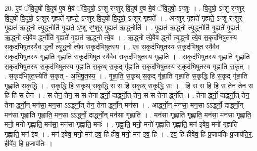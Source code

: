 \documentclass[17pt]{extarticle}
\begin{document}
20. ए॒वं ॅवि॒दुषो॑ वि॒दुष॑ ए॒व मे॒वं ॅवि॒दुषो॒ ऽꣳ॒शु रꣳ॒॒शुर् वि॒दुष॑ ए॒व मे॒वं 
ॅवि॒दुषो॒ ऽꣳ॒शुः । . वि॒दुषो॒ ऽꣳ॒शु रꣳ॒॒शुर् वि॒दुषो॑ वि॒दुषो॒ ऽꣳ॒शुर् गृ॒ह्यते॑ गृ॒ह्यते॒ ऽꣳ॒शुर् वि॒दुषो॑ 
वि॒दुषो॒ ऽꣳ॒शुर् गृ॒ह्यते᳚ । . अꣳ॒॒शुर् गृ॒ह्यते॑ गृ॒ह्यते॒ ऽꣳ॒शु रꣳ॒॒शुर् गृ॒ह्यत॑ ऋ॒द्ध्नो त्यृ॒द्ध्नोति॑ गृ॒ह्यते॒ ऽꣳ॒शु रꣳ॒॒शुर् गृ॒ह्यत॑ ऋ॒द्ध्नोति॑ । . गृ॒ह्यत॑ ऋ॒द्ध्नो त्यृ॒द्ध्नोति॑ गृ॒ह्यते॑ गृ॒ह्यत॑ ऋ॒द्ध्नो त्ये॒वैव र्द्ध्नोति॑ गृ॒ह्यते॑ गृ॒ह्यत॑ ऋ॒द्ध्नो त्ये॒व । . ऋ॒द्ध्नो त्ये॒वैव र्द्ध्नो त्यृ॒द्ध्नो त्ये॒व स॒कृद॑भिषुतस्य स॒कृद॑भिषुतस्यै॒व र्द्ध्नो त्यृ॒द्ध्नो त्ये॒व स॒कृद॑भिषुतस्य । . ए॒व स॒कृद॑भिषुतस्य स॒कृद॑भिषुत स्यै॒वैव स॒कृद॑भिषुतस्य गृह्णाति गृह्णाति स॒कृद॑भिषुत स्यै॒वैव स॒कृद॑भिषुतस्य गृह्णाति । . स॒कृद॑भिषुतस्य गृह्णाति गृह्णाति स॒कृद॑भिषुतस्य स॒कृद॑भिषुतस्य गृह्णाति स॒कृथ् स॒कृद् गृ॑ह्णाति स॒कृद॑भिषुतस्य स॒कृद॑भिषुतस्य गृह्णाति स॒कृत् । . स॒कृद॑भिषुत॒स्येति॑ स॒कृत् - अ॒भि॒षु॒त॒स्य॒ । . गृ॒ह्णा॒ति॒ स॒कृथ् स॒कृद् गृ॑ह्णाति गृह्णाति स॒कृद्धि हि स॒कृद् गृ॑ह्णाति गृह्णाति स॒कृद्धि । . स॒कृद्धि हि स॒कृथ् स॒कृद्धि स स हि स॒कृथ् स॒कृद्धि सः । . हि स स हि हि स तेन॒ तेन॒ स हि हि स तेन॑ । . स तेन॒ तेन॒ स स तेना र्द्ध्नो॒ दार्द्ध्नो॒त् तेन॒ स स तेना र्द्ध्नो᳚त् । . तेना र्द्ध्नो॒ दार्द्ध्नो॒त् तेन॒ तेना र्द्ध्नो॒न् मन॑सा॒ मन॒सा ऽऽर्द्ध्नो॒त् तेन॒ तेना र्द्ध्नो॒न् मन॑सा । . आर्द्ध्नो॒न् मन॑सा॒ मन॒सा ऽऽर्द्ध्नो॒ दार्द्ध्नो॒न् मन॑सा गृह्णाति गृह्णाति॒ मन॒सा ऽऽर्द्ध्नो॒ दार्द्ध्नो॒न् मन॑सा गृह्णाति । . मन॑सा गृह्णाति गृह्णाति॒ मन॑सा॒ मन॑सा गृह्णाति॒ मनो॒ मनो॑ गृह्णाति॒ मन॑सा॒ मन॑सा गृह्णाति॒ मनः॑ । . गृ॒ह्णा॒ति॒ मनो॒ मनो॑ गृह्णाति गृह्णाति॒ मन॑ इवेव॒ मनो॑ गृह्णाति गृह्णाति॒ मन॑ इव । . मन॑ इवेव॒ मनो॒ मन॑ इव॒ हि हीव॒ मनो॒ मन॑ इव॒ हि । . इ॒व॒ हि हीवे॑व॒ हि प्र॒जाप॑तिः प्र॒जाप॑ति॒र्॒. हीवे॑व॒ हि प्र॒जाप॑तिः । \newline
\end{document}
